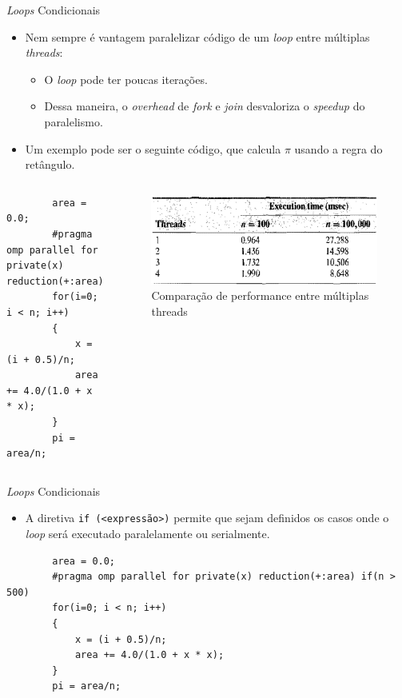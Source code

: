 \begin{frame}[fragile]{\textit{Loops} Condicionais}
	\begin{itemize}
		\item Nem sempre é vantagem paralelizar código de um \textit{loop} entre múltiplas \textit{threads}:
		\medskip
		\begin{itemize}
			\item O \textit{loop} pode ter poucas iterações.
			\smallskip
			\item Dessa maneira, o \textit{overhead} de \textit{fork} e \textit{join} desvaloriza o \textit{speedup} do paralelismo.
		\end{itemize}
		\medskip
		\item Um exemplo pode ser o seguinte código, que calcula $\pi$ usando a regra do retângulo.
	\end{itemize}
	\begin{columns}
		\begin{verbatim}
		area = 0.0;
		#pragma omp parallel for private(x) reduction(+:area)
		for(i=0; i < n; i++)
		{
			x = (i + 0.5)/n;
			area += 4.0/(1.0 + x * x);
		}
		pi = area/n;
		\end{verbatim}
		\begin{figure}[H]
			\centering
			\includegraphics[width=0.8\linewidth]{img/quinn/tab-cond-loop}
			\caption[Comparação de performance entre múltiplas threads]{Comparação de performance entre múltiplas threads}
			\label{fig:tab-cond-loop}
		\end{figure}
	\end{columns}
	
\end{frame}

\begin{frame}[fragile]{\textit{Loops} Condicionais}
	\begin{itemize}
		\item A diretiva \texttt{if (<expressão>)} permite que sejam definidos os casos onde o \textit{loop} será executado paralelamente ou serialmente.
	\end{itemize}
		\begin{verbatim}
		area = 0.0;
		#pragma omp parallel for private(x) reduction(+:area) if(n > 500)
		for(i=0; i < n; i++)
		{
			x = (i + 0.5)/n;
			area += 4.0/(1.0 + x * x);
		}
		pi = area/n;
		\end{verbatim}
\end{frame}

